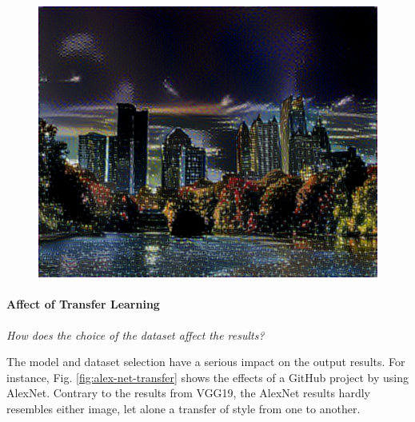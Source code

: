 \documentclass{article}
\begin{document}
\begin{figure}
    \begin{minipage}{0.3\linewidth}
    \includegraphics[width=\textwidth]{img/photo-transfer/x}
    \end{minipage}
\end{figure}


\paragraph{Affect of Transfer Learning} \textit{How does the choice of the
dataset affect the results?}

The model and dataset selection have a serious impact on the output results.
For instance, Fig. \ref{fig:alex-net-transfer} shows the effects of a GitHub
project by \cite{alexnet-transfer} using AlexNet. Contrary to the results
from VGG19, the AlexNet results hardly resembles either image, let alone a
transfer of style from one to another.
\end{document}
